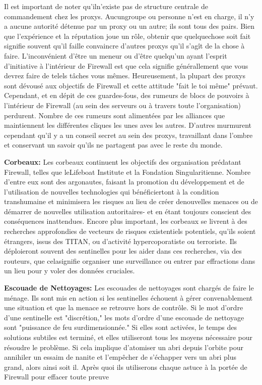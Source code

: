 Il est important de noter qu'iln'existe pas de structure centrale de commandement chez les proxys. Aucungroupe ou personne n'est en charge, il n'y a aucune autorité détenue par un proxy ou un autre; ils sont tous des pairs. Bien que l'expérience et la réputation joue un rôle, obtenir que quelquechose soit fait signifie souvent qu'il faille convaincre d'autres proxys qu'il s'agît de la chose à faire. L'inconvénient d'être un meneur ou d'être quelqu'un ayant l'esprit d'initiative à l'intérieur de Firewall est que cela signifie générallement que vous devrez faire de telels tâches vous mêmes. Heureusement, la plupart des proxys sont dévousé aux objectifs de Firewall et cette attitude "fait le toi même" prévaut. Cependant, et en dépit de ces guardes-fous, des rumeurs de blocs de pouvoirs à l'intérieur de Firewall (au sein des serveurs ou à travers toute l'organisation) perdurent. Nombre de ces rumeurs sont alimentées par les alliances que maintiennent les différentes cliques les unes aves les autres. D'autres murmurent cependant qu'il y a un conseil secret au sein des proxys, travaillant dans l'ombre et conservant un savoir qu'ils ne partagent pas avec le reste du monde. 

\textbf{Corbeaux:} Les corbeaux continuent les objectifs des organisation prédatant Firewall, telles que leLifeboat Institute et la Fondation Singularitienne. Nombre d'entre eux sont des argonautes, faisant la promotion du développement et de l'utilisation de nouvelles technologies qui bénéficiertont à la condition transhumaine et minimisera les risques au lieu de créer denouvelles menaces ou de démarrer de nouvelles utilisation autoritaires- et en étant toujours conscient des conséquences inattendues. Encore plus important, les corbeaux se livrent à des recherches approfondies de vecteurs de risques existentiels potentiels, qu'ils soient étrangers, issus des TITAN, ou d'activité hypercoporatiste ou terroriste. Ils déploieront souvent des sentinelles pour les aider dans ces recherches, via des routeurs, que celasignifie organiser une surveillance ou entrer par effractions dans un lieu pour y voler des données cruciales. 

\textbf{Escouade de Nettoyages:} Les escouades de nettoyages sont chargés de faire le ménage. Ils sont mis en action si les sentinelles échouent à gérer convenablement une situation et que la menace se retrouve hors de contrôle. Si le mot d'ordre d'une sentinelle est "discrétion," les mots d'ordre d'une escouade de nettoyage sont "puissance de feu surdimensionnée." Si elles sont activées, le temps des solutions subtiles est terminé, et elles utiliseront tous les moyens nécessaire pour résoudre le problème. Si cela implique d'atomiser un abri depuis l'orbite pour annihiler un essaim de nanite et l'empêcher de s'échapper vers un abri plus grand, alors ainsi soit il. Après quoi ils utiliserons chaque astuce à la portée de Firewall pour effacer toute preuve 

